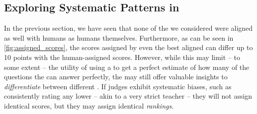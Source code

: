 \subsection{Exploring Systematic Patterns in \JudgeModels} \label{sec:results:exploringsystematicpatterns}


In the previous section, we have seen that none of the \judgemodels we considered were aligned as well with humans as humans themselves.
Furthermore, as can be seen in \cref{fig:assigned_scores}, the scores assigned by even the best aligned \judgemodels can differ up to 10 points with the human-assigned scores.
However, while this may limit -- to some extent -- the utility of using a \judgemodels to get a perfect estimate of how many of the questions the \evaluatormodels can answer perfectly, the \judgemodels may still offer valuable insights to \emph{differentiate} between different \evaluatormodels.
If judges exhibit systematic biases, such as consistently rating any \evaluatormodel lower -- akin to a very strict teacher -- they will not assign identical scores, but they may assign identical \emph{rankings}.

